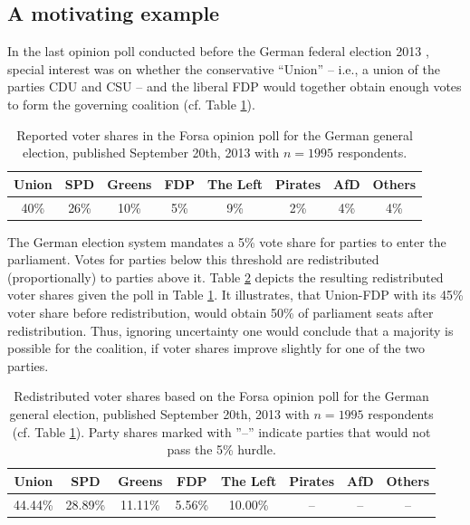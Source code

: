 \documentclass[smallcondensed]{svjour3}     %
\begin{document}
\subsection{A motivating example}\label{ssec:intro-ex-fdp}
In the last opinion poll conducted before the German federal election 2013 \citep{forsa_2013},
special interest was on whether the conservative ``Union'' -- i.e., a union of
the parties CDU and CSU -- and the liberal FDP would together obtain enough votes
to form the governing coalition (cf. Table \ref{tab_fdp}).

\begin{table}[!ht]\centering
\caption{Reported voter shares in the Forsa opinion poll for the German general
election, published September 20th, 2013 with $n=1995$ respondents.
\label{tab_fdp}
}
\medskip
\begin{tabular}{cccccccc}
\toprule[0.09 em]
Union & SPD & Greens & FDP & The Left & Pirates & AfD & Others \\
\midrule
40\% & 26\% & 10\% & 5\% & 9\% & 2\% & 4\% & 4\% \\
\bottomrule[0.09 em]
\end{tabular}
\end{table}

The German election system mandates a 5\% vote share for parties to enter the parliament.
Votes for parties below this threshold are redistributed (proportionally) to parties
above it. Table \ref{tab_fdp_redist} depicts the resulting redistributed voter
shares given the poll in Table \ref{tab_fdp}. It illustrates, that Union-FDP with
its 45\% voter share before redistribution, would obtain 50\% of parliament
seats after redistribution. Thus, ignoring uncertainty one would conclude that a
majority is possible for the coalition, if voter shares improve slightly for one
of the two parties.

\begin{table}[!ht]\centering
\caption{Redistributed voter shares based on the Forsa opinion poll for the German general election,
published September 20th, 2013 with $n=1995$ respondents (cf. Table \ref{tab_fdp}).
Party shares marked with ''--'' indicate parties that would not pass the 5\% hurdle.
\label{tab_fdp_redist}
}
\medskip
\begin{tabular}{cccccccc}
\toprule[0.09 em]
Union & SPD & Greens & FDP & The Left & Pirates & AfD & Others \\
\midrule
44.44\% & 28.89\% & 11.11\% & 5.56\% & 10.00\% & -- & -- & -- \\
\bottomrule[0.09 em]
\end{tabular}
\end{table}
\end{document}
